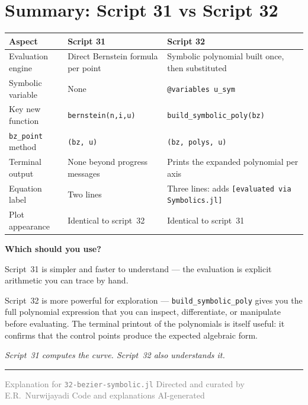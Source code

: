 \documentclass[12pt, a4paper]{article}
\newcommand{\cd}[1]{\texttt{#1}}
\begin{document}
\section{Summary: Script 31 vs Script 32}

\begin{center}
\begin{tabular}{lp{5cm}p{5cm}}
\toprule
Aspect & Script 31 & Script 32 \\
\midrule
Evaluation engine &
  Direct Bernstein formula per point &
  Symbolic polynomial built once, then substituted \\[4pt]
Symbolic variable &
  None &
  \cd{@variables u\_sym} \\[4pt]
Key new function &
  \cd{bernstein(n,i,u)} &
  \cd{build\_symbolic\_poly(bz)} \\[4pt]
\cd{bz\_point} method &
  \cd{(bz, u)} &
  \cd{(bz, polys, u)} \\[4pt]
Terminal output &
  None beyond progress messages &
  Prints the expanded polynomial per axis \\[4pt]
Equation label &
  Two lines &
  Three lines: adds \cd{[evaluated via Symbolics.jl]} \\[4pt]
Plot appearance &
  Identical to script~32 &
  Identical to script~31 \\
\bottomrule
\end{tabular}
\end{center}

\begin{notebox}
\textbf{Which should you use?}

Script~31 is simpler and faster to understand ---
the evaluation is explicit arithmetic you can trace
by hand.

Script~32 is more powerful for exploration ---
\cd{build\_symbolic\_poly} gives you the full polynomial
expression that you can inspect, differentiate, or
manipulate before evaluating.
The terminal printout of the polynomials is itself
useful: it confirms that the control points produce
the expected algebraic form.

\textit{Script~31 computes the curve.
Script~32 also \emph{understands} it.}
\end{notebox}

\vspace{2em}\hrule\vspace{0.5em}
{\small\textcolor{gray}{%
Explanation for \texttt{32-bezier-symbolic.jl}
\textbar{} Directed and curated by E.R.\ Nurwijayadi
\textbar{} Code and explanations AI-generated}}
\end{document}
